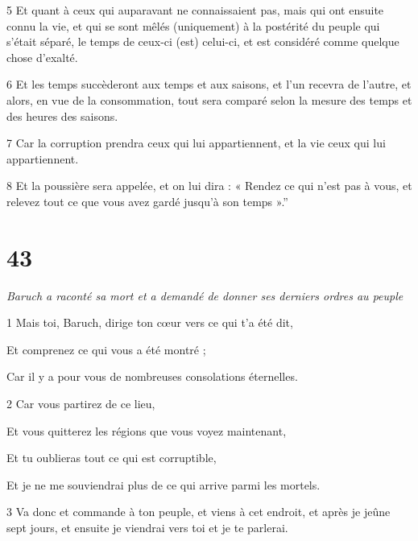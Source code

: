 \par 5 Et quant à ceux qui auparavant ne connaissaient pas, mais qui ont ensuite connu la vie, et qui se sont mêlés (uniquement) à la postérité du peuple qui s'était séparé, le temps de ceux-ci (est) celui-ci, et est considéré comme quelque chose d'exalté.

\par 6 Et les temps succèderont aux temps et aux saisons, et l'un recevra de l'autre, et alors, en vue de la consommation, tout sera comparé selon la mesure des temps et des heures des saisons.

\par 7 Car la corruption prendra ceux qui lui appartiennent, et la vie ceux qui lui appartiennent.

\par 8 Et la poussière sera appelée, et on lui dira : « Rendez ce qui n'est pas à vous, et relevez tout ce que vous avez gardé jusqu'à son temps ».''


\chapter{43}

\par \textit{Baruch a raconté sa mort et a demandé de donner ses derniers ordres au peuple}

\par 1 Mais toi, Baruch, dirige ton cœur vers ce qui t'a été dit,

\par Et comprenez ce qui vous a été montré ;

\par Car il y a pour vous de nombreuses consolations éternelles.

\par 2 Car vous partirez de ce lieu,

\par Et vous quitterez les régions que vous voyez maintenant,

\par Et tu oublieras tout ce qui est corruptible,

\par Et je ne me souviendrai plus de ce qui arrive parmi les mortels.

\par 3 Va donc et commande à ton peuple, et viens à cet endroit, et après je jeûne sept jours, et ensuite je viendrai vers toi et je te parlerai.

